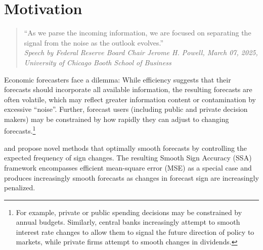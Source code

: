 \documentclass[11pt,a4paper]{article}
\begin{document}
\onehalfspacing
\renewcommand{\thepage}{\arabic{page}} \setcounter{page}{1}
\newpage
\section{Motivation}\label{sec:motivation}

\begin{quote}
     \quad ``As we parse the incoming information, we are focused on separating the signal from the noise as the outlook evolves.''\\
    \textit{Speech by Federal Reserve Board Chair Jerome H. Powell, March 07, 2025, \\
    University of Chicago Booth School of Business}
\end{quote}

Economic forecasters face a dilemma: While efficiency suggests that their forecasts should incorporate all available information, the resulting forecasts are often volatile, which may reflect greater information content or contamination by excessive ``noise''. Further, forecast users (including public and private decision makers) may be constrained by how rapidly they can adjust to changing forecasts.\footnote{For example, private or public spending decisions may be constrained by annual budgets. Similarly, central banks increasingly attempt to smooth interest rate changes to allow them to signal the future direction of policy to markets, while private firms attempt to smooth changes in dividends.}


\cite{Wildi2024,Wildi2025} and \cite{McElroy2019,McElroy2020} propose novel methods that optimally smooth forecasts by controlling the expected frequency of sign changes. The resulting Smooth Sign Accuracy (SSA) framework encompasses efficient mean-square error (MSE) as a special case and produces increasingly smooth forecasts as changes in forecast sign are increasingly penalized. 

\end{document}
